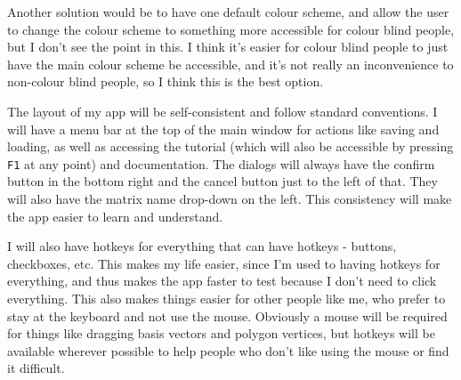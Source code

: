 \documentclass[../main.tex]{subfiles}
\begin{document}
Another solution would be to have one default colour scheme, and allow the user to change the colour scheme to something more accessible for colour blind people, but I don't see the point in this. I think it's easier for colour blind people to just have the main colour scheme be accessible, and it's not really an inconvenience to non-colour blind people, so I think this is the best option.

The layout of my app will be self-consistent and follow standard conventions. I will have a menu bar at the top of the main window for actions like saving and loading, as well as accessing the tutorial (which will also be accessible by pressing \texttt{F1} at any point) and documentation. The dialogs will always have the confirm button in the bottom right and the cancel button just to the left of that. They will also have the matrix name drop-down on the left. This consistency will make the app easier to learn and understand.

I will also have hotkeys for everything that can have hotkeys - buttons, checkboxes, etc. This makes my life easier, since I'm used to having hotkeys for everything, and thus makes the app faster to test because I don't need to click everything. This also makes things easier for other people like me, who prefer to stay at the keyboard and not use the mouse. Obviously a mouse will be required for things like dragging basis vectors and polygon vertices, but hotkeys will be available wherever possible to help people who don't like using the mouse or find it difficult.
\end{document}
